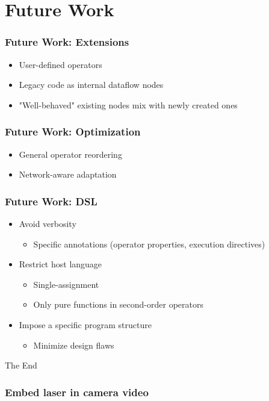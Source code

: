 \documentclass{beamer}
\newenvironment{mysubsec}[1]
{   \begin{frame}
	\frametitle{#1} }
{ \end{frame} }
\begin{document}
\section{Future Work}
	\begin{mysubsec}{Future Work: Extensions}
		\begin{itemize}
		\item User-defined operators
		\item Legacy code as internal dataflow nodes 
		\item "Well-behaved" existing nodes mix with newly created ones
		\end{itemize}
	\end{mysubsec}
	\begin{mysubsec}{Future Work: Optimization}
		\begin{itemize}
		\item General operator reordering
		\item Network-aware adaptation
		\end{itemize}
	\end{mysubsec}
	\begin{mysubsec}{Future Work: DSL}		
		\begin{itemize}
		\item Avoid verbosity 
			\begin{itemize} \item Specific annotations (operator properties, execution directives)\end{itemize}
		\item Restrict host language
			\begin{itemize}
			\item Single-assignment
			\item Only pure functions in second-order operators
			\end{itemize}
		\item Impose a specific program structure 
			\begin{itemize} \item Minimize design flaws \end{itemize}
		\end{itemize}
	\end{mysubsec}
\begin{frame}
	\Huge{\centerline{The End}}
\end{frame}
\begin{frame} \frametitle{Embed laser in camera video}
\inputminted[fontsize=\tiny]{java}{code/StreamMerger.java}
\end{frame}
\end{document}
